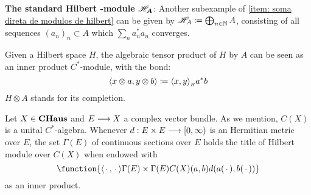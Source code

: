 \begin{exemplos}
\begin{itroman}
    \item \textbf{The standard Hilbert -module $\boldsymbol{\mathscr H_A}$}: Another subexample of \ref{item: soma direta de modulos de hilbert} can be given by $\mathscr H_A \coloneqq \bigoplus_{n\in \mathbb N} A$, consisting of all sequences $(a_n)_n \subset A$ which $\sum_n a_n^*a_n$ converges.
    \item \label{exemplo hilb (X) C*algebra} Given a Hilbert space $H$, the algebraic tensor product of $H$ by $A$ can be seen as an inner product $C^*$-module, with the bond:
    \[
    \inner {x\otimes a}{y\otimes b} \coloneqq \sub{\inner xy}H a^*b
    \]
    $H\otimes A$ stands for its completion.
    
    \item Let $X \in \boldsymbol{\operatorname{CHaus}}$ and $E\longrightarrow X$ a complex vector bundle. As we mention, $C(X)$ is a unital $C^*$-algebra. Whenever $d: E\times E \longrightarrow [0,\infty)$ is an Hermitian metric over $E$, the set $\Gamma (E)$ of continuous sections over $E$ holds the title of Hilbert module over $C(X)$ when endowed with
    \begin{equation*}
    \function{{\inner\come\come}{\Gamma(E)\times \Gamma(E)}{C(X)}{(a,b)}{d(a(\,\cdot\,),b(\,\cdot\,))}} 
    \end{equation*}
    as an inner product.

\end{itroman}
\end{exemplos}
%

